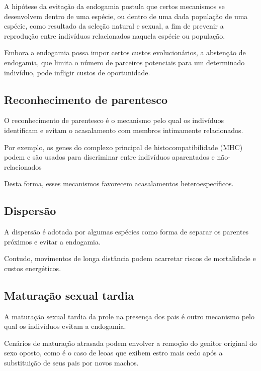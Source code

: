 \documentclass[
]{book}
\begin{document}
A hipótese da evitação da endogamia postula que certos mecanismos se desenvolvem dentro de uma espécie, ou dentro de uma dada população de uma espécie, como resultado da seleção natural e sexual, a fim de prevenir a reprodução entre indivíduos relacionados naquela espécie ou população.

Embora a endogamia possa impor certos custos evolucionários, a abstenção de endogamia, que limita o número de parceiros potenciais para um determinado indivíduo, pode infligir custos de oportunidade.

\hypertarget{reconhecimento-de-parentesco}{%
\subsection{Reconhecimento de parentesco}\label{reconhecimento-de-parentesco}}

O reconhecimento de parentesco é o mecanismo pelo qual os indivíduos identificam e evitam o acasalamento com membros intimamente relacionados.

Por exemplo, os genes do complexo principal de histocompatibilidade (MHC) podem e são usados para discriminar entre indivíduos aparentados e não-relacionados

Desta forma, esses mecanismos favorecem acasalamentos heteroespecíficos.

\hypertarget{dispersuxe3o}{%
\subsection{Dispersão}\label{dispersuxe3o}}

A dispersão é adotada por algumas espécies como forma de separar os parentes próximos e evitar a endogamia.

Contudo, movimentos de longa distância podem acarretar riscos de mortalidade e custos energéticos.

\hypertarget{maturauxe7uxe3o-sexual-tardia}{%
\subsection{Maturação sexual tardia}\label{maturauxe7uxe3o-sexual-tardia}}

A maturação sexual tardia da prole na presença dos pais é outro mecanismo pelo qual os indivíduos evitam a endogamia.

Cenários de maturação atrasada podem envolver a remoção do genitor original do sexo oposto, como é o caso de leoas que exibem estro mais cedo após a substituição de seus pais por novos machos.
\end{document}
